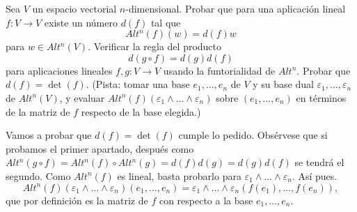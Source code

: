 \documentclass[twoside]{article}
\begin{document}
\begin{ejercicio}{2.12}
Sea $V$ un espacio vectorial $n$-dimensional. Probar que para una aplicación lineal $f:V\to V$ existe un número $d(f)$ tal que
\[
Alt^n(f)(w)=d(f)w
\]
para $w\in Alt^n(V)$. Verificar la regla del producto
\[
d(g\circ f)=d(g)d(f)
\]
para aplicaciones lineales $f,g:V\to V$ usando la funtorialidad de $Alt^n$. Probar que $d(f)=\det(f)$. (Pista: tomar una base $e_1,\dots, e_n$ de $V$ y su base dual $\varepsilon_1,\dots,\varepsilon_n$ de $Alt^n(V)$, y evaluar $Alt^n(f)(\varepsilon_1\land\dots\land\varepsilon_n)$ sobre $(e_1,\dots, e_n)$ en términos de la matriz de $f$ respecto de la base elegida.)
\end{ejercicio}
\begin{solucion}
Vamos a probar que $d(f)=\det(f)$ cumple lo pedido. Obsérvese que si probamos el primer apartado, después como $Alt^n(g\circ f)=Alt^n(f)\circ Alt^n(g)=d(f)d(g)=d(g)d(f)$ se tendrá el segundo. Como $Alt^n(f)$ es lineal, basta probarlo para $\varepsilon_1\land\dots\land\varepsilon_n$. Así pues.
\[
Alt^n(f)(\varepsilon_1\land\dots\land\varepsilon_n)(e_1,\dots, e_n)=\varepsilon_1\land\dots\land\varepsilon_n(f(e_1),\dots, f(e_n)),
\]
que por definición es la matriz de $f$ con respecto a la base $e_1,\dots, e_n$. 
\end{solucion}
\end{document}
